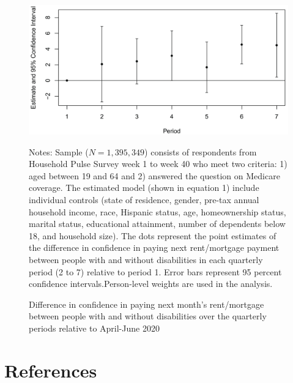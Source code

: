 \documentclass[12pt]{article}
\begin{document}
\begin{figure}[h!]\label{rent_conf_wc}
\caption{Difference in confidence in paying next month's rent/mortgage between people with and without disabilities over the quarterly periods relative to April-June 2020}
\centering
\includegraphics[scale=0.8]{Exhibits/mort_conf_event_study_with_controls.jpg}
\medskip 
\begin{minipage}{0.8\textwidth} 
{\footnotesize Notes: Sample ($N=1,395,349$) consists of respondents from Household Pulse Survey week 1 to week 40 who meet two criteria: 1) aged between 19 and 64 and 2) answered the question on Medicare coverage. The estimated model (shown in equation 1) include individual controls (state of residence, gender, pre-tax annual household income, race, Hispanic status, age, homeownership status,
marital status, educational attainment, number of dependents below 18, and household size). The dots represent the point estimates of the difference in confidence in paying next rent/mortgage payment between people with and without disabilities in each quarterly period (2 to 7) relative to period 1. Error bars represent 95 percent confidence intervals.Person-level weights are used in the analysis.  \par}
\end{minipage}
\end{figure}
 


 


 



 



 
\clearpage


\section*{References}
\renewcommand*{\refname}{\vspace*{-12mm}} 
\end{document}
